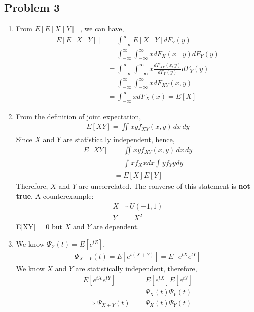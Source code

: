 \documentclass{article}
\begin{document}
	\subsection*{Problem 3}
		\begin{enumerate}
			\item From $E[E[X \mid Y]]$, we can have,
				\begin{align*}
					E[E[X \mid Y]] &= \int_{-\infty}^{\infty} E[X \mid Y] dF_{Y}(y) \\
					&= \int_{-\infty}^{\infty}\int_{-\infty}^{\infty}x dF_{X}(x \mid y)dF_{Y}(y) \\
					&= \int_{-\infty}^{\infty}\int_{-\infty}^{\infty}x \frac{dF_{XY}(x,y)}{dF_{Y}(y)} dF_{Y}(y) \\
					&= \int_{-\infty}^{\infty}\int_{-\infty}^{\infty}x dF_{XY}(x,y) \\
					&= \int_{-\infty}^{\infty}x dF_{X}(x) = E[X]
				\end{align*}
			\item From the definition of joint expectation,
				\begin{align*}
					E[XY] = \iint_{}xyf_{XY}(x,y) \,dx\,dy
				\end{align*}
				Since $X$ and $Y$ are statistically independent, hence,
				\begin{align*}
					E[XY] &= \iint_{}xyf_{XY}(x,y) \,dx\,dy \\
					&= \int_{}^{}xf_X{x}dx \int_{}^{}yf_Y{y}dy \\
					&= E[X]E[Y]
				\end{align*}
				Therefore, $X$ and $Y$ are uncorrelated. The converse of this statement is
				\textbf{not true}. A counterexample:
				\begin{align*}
					X & \sim \mathrm{\textit{U}}(-1,1) \\
					Y &= X^2
				\end{align*}
				E[XY] = 0 but $X$ and $Y$ are dependent.
			\item We know $\Psi_{Z}(t) = E[e^{tZ}]$,
				\begin{align*}
					\Psi_{X+Y}(t) = E[e^{t(X+Y)}] = E[e^{tX}e^{tY}]
				\end{align*}
				We know $X$ and $Y$ are statistically independent, therefore,
				\begin{align*}
					E[e^{tX}e^{tY}] &= E[e^{tX}]E[e^{tY}] \\
					&= \Psi_{X}(t)\Psi_{Y}(t) \\
					\implies \Psi_{X+Y}(t) &= \Psi_{X}(t)\Psi_{Y}(t)
				\end{align*}

\end{enumerate}
\end{document}
